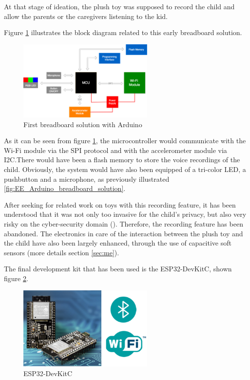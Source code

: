 At that stage of ideation, the plush toy was supposed to record the child and allow the parents or the caregivers listening to the kid. 

\medskip Figure \ref{fig:EE_Arduino_block_diagram} illustrates the block diagram related to this early breadboard solution.

\begin{figure}[H]
    \centering
    \includegraphics[width=0.6\textwidth]{images/EE_Arduino_block_diagram.png}
    \caption{First breadboard solution with Arduino}
    \label{fig:EE_Arduino_block_diagram}
\end{figure}

As it can be seen from figure \ref{fig:EE_Arduino_block_diagram}, the microcontroller would communicate with the Wi-Fi module via the SPI protocol and with the accelerometer module via I2C.There would have been a flash memory to store the voice recordings of the child. Obviously, the system would have also been equipped of a tri-color LED, a pushbutton and a microphone, as previously illustrated \ref{fig:EE_Arduino_breadboard_solution}.

\medskip After seeking for related work on toys with this recording feature, it has been understood that it was not only too invasive for the child's privacy, but also very risky on the cyber-security domain (\cite{mcreynolds2017toys}). Therefore, the recording feature has been abandoned. The electronics in care of the interaction between the plush toy and the child have also been largely enhanced, through the use of capacitive soft sensors (more details section \ref{sec:me}).

\medskip The final development kit that has been used is the ESP32-DevKitC, shown figure \ref{fig:ESP32-DevKitC}. 

\begin{figure}[H]
    \centering
    \includegraphics[width=0.6\textwidth]{images/EE_wifi_BLE.PNG}
    \caption{ESP32-DevKitC}
    \label{fig:ESP32-DevKitC}
\end{figure}




